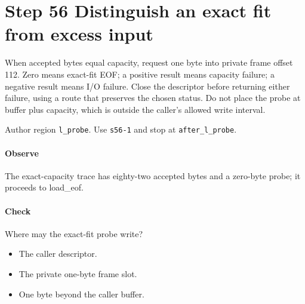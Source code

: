 \section{Step 56 Distinguish an exact fit from excess input}\label{pcm-wav-s56}
When accepted bytes equal capacity, request one byte into private frame offset 112. Zero means exact-fit EOF; a positive result means capacity failure; a negative result means I/O failure. Close the descriptor before returning either failure, using a route that preserves the chosen status. Do not place the probe at buffer plus capacity, which is outside the caller's allowed write interval.

Author region \texttt{l\_probe}. Use \texttt{s56-1} and stop at \texttt{after\_l\_probe}.

\paragraph{Observe} The exact-capacity trace has eighty-two accepted bytes and a zero-byte probe; it proceeds to load\_eof.

\paragraph{Check} Where may the exact-fit probe write?
\begin{itemize}
  \item[A.] The caller descriptor.
  \item[B.] The private one-byte frame slot.
  \item[C.] One byte beyond the caller buffer.
\end{itemize}
